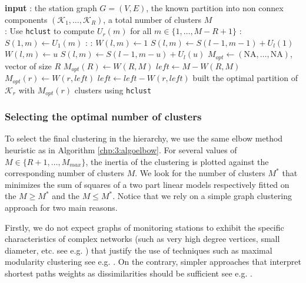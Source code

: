 \begin{enumerate}
\begin{algorithm}[htbp]
\begin{algorithmic}
\State \textbf{input} : the station graph $G=(V,E)$, the known partition into non connex components $(\mathcal{K}_1,\dots,\mathcal{K}_R)$, a total number of clusters $M$ \\
    
  : 
 \State Use \texttt{hclust} to compute $U_r(m)$ for all $m \in \{1,\dots,M-R+1\}$
 \EndFor 
  : 
 \State $S(1,m) \gets U_1(m)$ 
 \EndFor 
  : 
   : 
     \State $W(l,m) \gets 1$ 
     \State $S(l,m) \gets S(l-1,m-1)+U_l(1)$
     \State $W(l,m) \gets u$
     \State $S(l,m) \gets S(l-1,m-u)+U_l(u)$
   \EndIf
   \EndFor
 \EndFor 
 \EndFor 
 \State $M_{opt} \gets (\text{NA},\dots,\text{NA})$, vector of size $R$
 \State $M_{opt}(R) \gets W(R,M)$
 \State $\textit{left} \gets M-W(R,M)$
 \State $M_{opt}(r) \gets W(r,\textit{left})$
 \State $\textit{left} \gets \textit{left}-W(r,\textit{left})$
 \EndFor
 \State built the optimal partition of $\mathcal{K}_r$ with $M_{opt}(r)$ clusters using \texttt{hclust}
 \EndFor 
\end{algorithmic}
\end{algorithm} 
\end{enumerate}

\subsubsection{Selecting the optimal number of clusters}

To select the final clustering in the hierarchy, we use the same elbow method heuristic as in Algorithm \ref{chp:3:algoelbow}. For several values of $M\in\{R+1,\dots,M_{max}\}$, the inertia of the clustering is plotted against the corresponding number of clusters $M$. We look for the number of clusters $M^*$ that minimizes the sum of squares of a two part linear models respectively fitted on the $M \geq M^*$ and the $M \leq M^*$. 
\newline
Notice that we rely on a simple graph clustering approach for two main reasons. 

Firstly, we do not expect graphs of monitoring stations to exhibit the specific characteristics of complex networks (such as very high degree vertices, small diameter, etc. see e.g. \cite{Newman2003GraphSurveySIAM}) that justify the use of techniques such as maximal modularity clustering see e.g. \cite{FortunatoSurveyGraphs2010}. On the contrary, simpler approaches that interpret shortest paths weights as dissimilarities should be sufficient see e.g. \cite{Schaeffer:COSREV2007}. 

